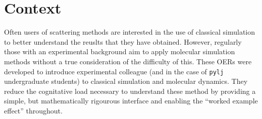 \section*{Context}
Often users of scattering methods are interested in the use of classical simulation to better understand the reuslts that they have obtained.
However, regularly those with an experimental background aim to apply molecular simulation methods without a true consideration of the difficulty of this.
These OERs were developed to introduce experimental colleague (and in the case of \texttt{pylj} undergraduate students) to classical simulation and molecular dynamics.
They reduce the cognitative load necessary to understand these method by providing a simple, but mathematically rigourous interface and enabling the ``worked example effect'' throughout.
